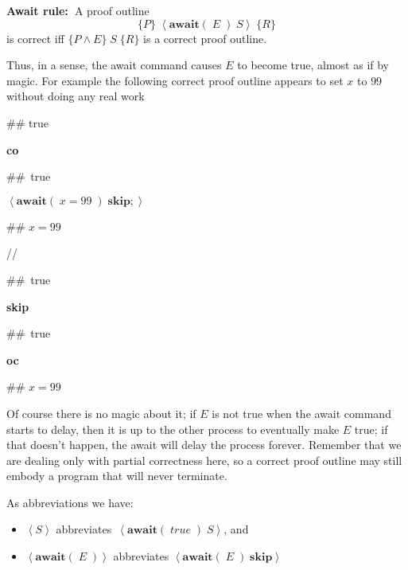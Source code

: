 \documentclass[11pt]{article}%
\begin{document}
\textbf{Await rule:\ }A proof outline%
\[
\{P\}\;\left\langle \mathbf{await}(\;E\;)\;S\right\rangle \;\{R\}
\]
is correct iff $\{P\wedge E\}\;S\;\{R\}$ is a correct proof outline.

Thus, in a sense, the await command causes $E$ to become true, almost as if by
magic. For example the following correct proof outline appears to set $x$ to
$99$ without doing any real work

\begin{code}
\#\# true

\textbf{co}

\begin{indent}
\item \#\#\ true

\item $\left\langle \mathbf{await}(\;x=99\;)\;\mathbf{skip};\right\rangle $

\item \#\# $x=99$
\end{indent}

//

\begin{indent}
\item \#\#\ true

\item \textbf{skip}

\item \#\#\ true
\end{indent}

\textbf{oc}

\#\# $x=99$
\end{code}

\noindent Of course there is no magic about it; if $E$ is not true when the
await command starts to delay, then it is up to the other process to
eventually make $E$ true; if that doesn't happen, the await will delay the
process forever. Remember that we are dealing only with partial correctness
here, so a correct proof outline may still embody a program that will never terminate.

As abbreviations we have:

\begin{itemize}
\item $\left\langle S\right\rangle $ abbreviates $\,\left\langle
\mathbf{await}(\;\mathit{true}\;)\;S\right\rangle $, and

\item $\left\langle \mathbf{await}(\;E\;)\right\rangle $ abbreviates
$\left\langle \mathbf{await}(\;E\;)\;\mathbf{skip}\right\rangle $
\end{itemize}
\end{document}

